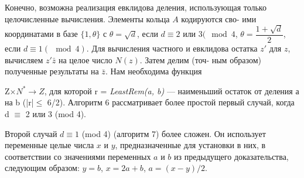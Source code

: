 \hspace*{15pt}Конечно, возможна реализация евклидова деления, использующая\linebreak
только целочисленные вычисления. Элементы кольца $A$ кодируются сво-\linebreak
ими координатами в базе $\{1,\theta\}$ с $\theta=\sqrt{d}$, если $d\equiv2$ или $3 (\mod{4}$,\linebreak
$\theta=\dfrac{1+\sqrt{d}}{2}$, если $d\equiv1 (\mod{4})$. Для вычисления частного и евклидова\linebreak
остатка $z'$ для $z$, вычисляем $z'\bar{z}$ на целое число $N(z)$. Затем делим (точ-\linebreak
ным образом) полученные результаты на $\bar{z}$. Нам необходима функция\linebreak

\pagebreak
%
%
 Z$\times N^{\ast} \longrightarrow Z$,  для которой r = {\it LeastRem(a, b)} — наименьший\linebreak
остаток от деления а на b (|r|$\leqslant$ 6/2). Алгоритм 6 рассматривает более\linebreak
простой первый случай, когда d $\equiv$ 2 или 3 (mod 4).

Второй случай $d\equiv1$ (mod 4) (алгоритм 7) более сложен. Он использует\linebreak
переменные целые числа $x$ и $y$, предназначенные для установки в них,\linebreak
в соответствии со значениями переменных $a$ и $b$ из предыдущего\linebreak
доказательства, следующим образом: $y=b$, $x=2a+b$, $a=(x-y)/2$.

\def\MYdef{\mathrel{\stackrel{\rm def}=}}

